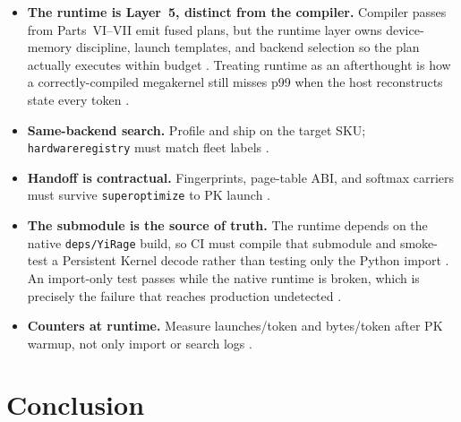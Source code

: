 \begin{itemize}
\item \textbf{The runtime is Layer~5, distinct from the compiler.} Compiler passes from Parts~VI--VII emit fused plans, but the runtime layer owns device-memory discipline, launch templates, and backend selection so the plan actually executes within budget \citep{yirage2026,chen2020compilerbasedhardw}. Treating runtime as an afterthought is how a correctly-compiled megakernel still misses p99 when the host reconstructs state every token \citep{patel2025llminference,dlbook}.
\item \textbf{Same-backend search.} Profile and ship on the target SKU; \texttt{hardwareregistry} must match fleet labels \citep{yirage2026,chen2020compilerbasedhardw,taxbreak2026,memoryfloor2026,amd2024xdna,amd2024aie}.
\item \textbf{Handoff is contractual.} Fingerprints, page-table ABI, and softmax carriers must survive \texttt{superoptimize} to PK launch \citep{yirage2026,dao2022flashattention,kwon2023vllm,memoryfloor2026,taxbreak2026}.
\item \textbf{The submodule is the source of truth.} The runtime depends on the native \texttt{deps/YiRage} build, so CI must compile that submodule and smoke-test a Persistent Kernel decode rather than testing only the Python import \citep{yirage2026,chen2020compilerbasedhardw}. An import-only test passes while the native runtime is broken, which is precisely the failure that reaches production undetected \citep{patel2025llminference,dlbook}.
\item \textbf{Counters at runtime.} Measure launches/token and bytes/token after PK warmup, not only import or search logs \citep{taxbreak2026,memoryfloor2026,patel2025llminference,yirage2026,chen2020compilerbasedhardw,kwon2023vllm,nvidia2024cudagraphs,dlbook}.
\end{itemize}

\section{Conclusion}
\label{sec:ch29_conclusion}

